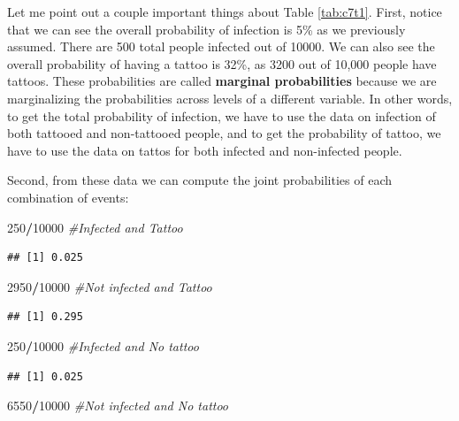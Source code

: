 \documentclass[
]{book}
\newenvironment{Shaded}{\begin{snugshade}}{\end{snugshade}}
\newcommand{\CommentTok}[1]{\textcolor[rgb]{0.56,0.35,0.01}{\textit{#1}}}
\newcommand{\DecValTok}[1]{\textcolor[rgb]{0.00,0.00,0.81}{#1}}
\newcommand{\SpecialCharTok}[1]{\textcolor[rgb]{0.81,0.36,0.00}{\textbf{#1}}}
\begin{document}
Let me point out a couple important things about Table \ref{tab:c7t1}. First, notice that we can see the overall probability of infection is 5\% as we previously assumed. There are 500 total people infected out of 10000. We can also see the overall probability of having a tattoo is 32\%, as 3200 out of 10,000 people have tattoos. These probabilities are called \textbf{marginal probabilities} because we are marginalizing the probabilities across levels of a different variable. In other words, to get the total probability of infection, we have to use the data on infection of both tattooed and non-tattooed people, and to get the probability of tattoo, we have to use the data on tattos for both infected and non-infected people.

Second, from these data we can compute the joint probabilities of each combination of events:

\begin{Shaded}
\begin{Highlighting}[]
\DecValTok{250}\SpecialCharTok{/}\DecValTok{10000} \CommentTok{\#Infected and Tattoo}
\end{Highlighting}
\end{Shaded}

\begin{verbatim}
## [1] 0.025
\end{verbatim}

\begin{Shaded}
\begin{Highlighting}[]
\DecValTok{2950}\SpecialCharTok{/}\DecValTok{10000} \CommentTok{\#Not infected and Tattoo}
\end{Highlighting}
\end{Shaded}

\begin{verbatim}
## [1] 0.295
\end{verbatim}

\begin{Shaded}
\begin{Highlighting}[]
\DecValTok{250}\SpecialCharTok{/}\DecValTok{10000} \CommentTok{\#Infected and No tattoo}
\end{Highlighting}
\end{Shaded}

\begin{verbatim}
## [1] 0.025
\end{verbatim}

\begin{Shaded}
\begin{Highlighting}[]
\DecValTok{6550}\SpecialCharTok{/}\DecValTok{10000} \CommentTok{\#Not infected and No tattoo}
\end{Highlighting}
\end{Shaded}
\end{document}
